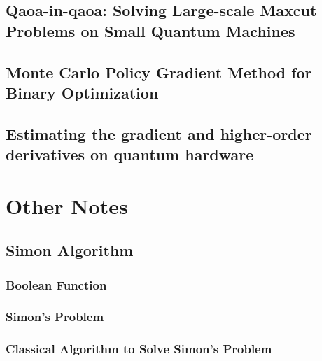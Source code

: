 \documentclass[
	11pt, %
	a4paper, %
]{LegrandOrangeBook}
\begin{document}
\chapter{Qaoa-in-qaoa: Solving Large-scale Maxcut Problems on Small Quantum Machines}


\chapter{Monte Carlo Policy Gradient Method for Binary Optimization}


\chapter{Estimating the gradient and higher-order derivatives on quantum hardware}


%


\part{Other Notes}

\chapter{Simon Algorithm}

    \section{Boolean Function}
    

    \section{Simon's Problem}
    

    \section{Classical Algorithm to Solve Simon's Problem}
    
\end{document}
